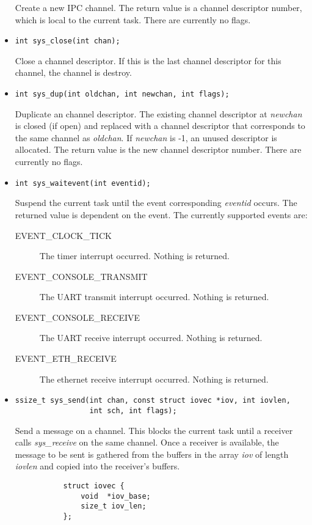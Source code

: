 \documentclass[letterpaper]{article}
\begin{document}
\begin{itemize}
Create a new IPC channel. The return value is a channel descriptor number, which
is local to the current task. There are currently no flags.
\item \begin{verbatim}int sys_close(int chan);\end{verbatim}
Close a channel descriptor. If this is the last channel descriptor for
this channel, the channel is destroy.
\item \begin{verbatim}int sys_dup(int oldchan, int newchan, int flags);\end{verbatim}
Duplicate an channel descriptor. The existing channel descriptor at \emph{newchan} is closed (if open) and replaced with a channel
descriptor that corresponds to the same channel as \emph{oldchan}. If \emph{newchan} is -1, an unused
descriptor is allocated. The return value is the new channel descriptor number. There are currently no flags.
\item \begin{verbatim}int sys_waitevent(int eventid);\end{verbatim}
Suspend the current task until the event corresponding \emph{eventid} occurs. The returned value
is dependent on the event. The currently supported events are:
\begin{description}
\item[EVENT\_CLOCK\_TICK] The timer interrupt occurred. Nothing is returned.
\item[EVENT\_CONSOLE\_TRANSMIT] The UART transmit interrupt occurred. Nothing is returned.
\item[EVENT\_CONSOLE\_RECEIVE] The UART receive interrupt occurred. Nothing is returned.
\item[EVENT\_ETH\_RECEIVE] The ethernet receive interrupt occurred. Nothing is returned.
\end{description}

\item \begin{verbatim}
ssize_t sys_send(int chan, const struct iovec *iov, int iovlen,
                 int sch, int flags);\end{verbatim}
	Send a message on a channel. This blocks the current task until a receiver calls \emph{sys\_receive} on the
	same channel. Once a receiver is available, the message to be sent is gathered from the buffers in the array
	\emph{iov} of length \emph{iovlen} and copied into the receiver's buffers.

	\begin{verbatim}
           struct iovec {
               void  *iov_base;
               size_t iov_len;
           };
	\end{verbatim}


\end{itemize}
\end{document}
